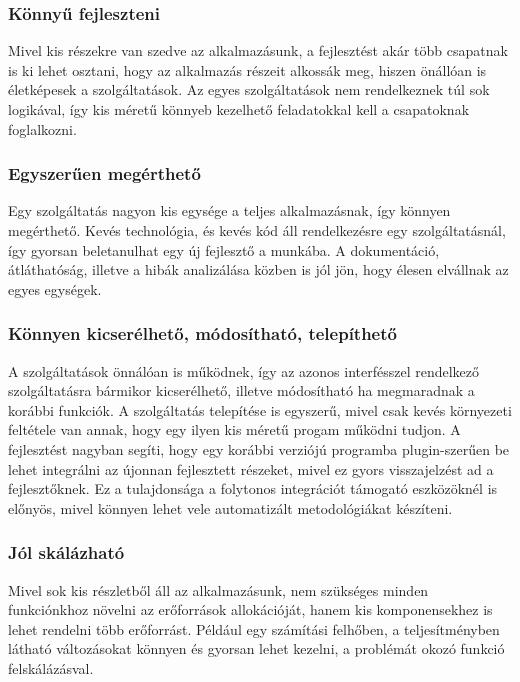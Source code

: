 \documentclass[11pt,magyar,a4paper,twoside,]{report}
\begin{document}
\subsubsection{Könnyű fejleszteni}\label{kuxf6nnyux171-fejleszteni}

Mivel kis részekre van szedve az alkalmazásunk, a fejlesztést akár több
csapatnak is ki lehet osztani, hogy az alkalmazás részeit alkossák meg,
hiszen önállóan is életképesek a szolgáltatások. Az egyes szolgáltatások
nem rendelkeznek túl sok logikával, így kis méretű könnyeb kezelhető
feladatokkal kell a csapatoknak foglalkozni.

\subsubsection{Egyszerűen
megérthető}\label{egyszerux171en-meguxe9rthetux151}

Egy szolgáltatás nagyon kis egysége a teljes alkalmazásnak, így könnyen
megérthető. Kevés technológia, és kevés kód áll rendelkezésre egy
szolgáltatásnál, így gyorsan beletanulhat egy új fejlesztő a munkába. A
dokumentáció, átláthatóság, illetve a hibák analizálása közben is jól
jön, hogy élesen elvállnak az egyes egységek.

\subsubsection{Könnyen kicserélhető, módosítható,
telepíthető}\label{kuxf6nnyen-kicseruxe9lhetux151-muxf3dosuxedthatuxf3-telepuxedthetux151}

A szolgáltatások önnálóan is működnek, így az azonos interfésszel
rendelkező szolgáltatásra bármikor kicserélhető, illetve módosítható ha
megmaradnak a korábbi funkciók. A szolgáltatás telepítése is egyszerű,
mivel csak kevés környezeti feltétele van annak, hogy egy ilyen kis
méretű progam működni tudjon. A fejlesztést nagyban segíti, hogy egy
korábbi verziójú programba plugin-szerűen be lehet integrálni az újonnan
fejlesztett részeket, mivel ez gyors visszajelzést ad a fejlesztőknek.
Ez a tulajdonsága a folytonos integrációt támogató eszközöknél is
előnyös, mivel könnyen lehet vele automatizált metodológiákat készíteni.

\subsubsection{Jól skálázható}\label{juxf3l-skuxe1luxe1zhatuxf3}

Mivel sok kis részletből áll az alkalmazásunk, nem szükséges minden
funkciónkhoz növelni az erőforrások allokációját, hanem kis
komponensekhez is lehet rendelni több erőforrást. Például egy számítási
felhőben, a teljesítményben látható változásokat könnyen és gyorsan
lehet kezelni, a problémát okozó funkció felskálázásval.
\end{document}
